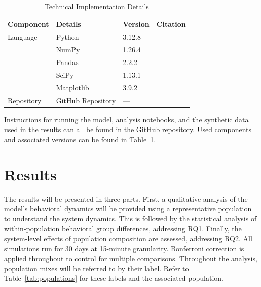 \documentclass[11pt, a4paper]{article}
\begin{document}
\begin{table}[h]
    \caption{Technical Implementation Details}
    \label{tab:technical_implementation}
    \centering
    \begin{tabular}{llll}
    \toprule
    Component & Details & Version & Citation \\
    \midrule
    Language & Python & 3.12.8 & \autocite{rossum_python_2007} \\
    \addlinespace
    \multirow{4}{*}{Packages} & NumPy & 1.26.4 & \autocite{harris_array_2020} \\
                              & Pandas & 2.2.2 & \autocite{mckinney_data_2010} \\
                              & SciPy & 1.13.1 & \autocite{virtanen_scipy_2020} \\
                              & Matplotlib & 3.9.2 & \autocite{hunter_matplotlib_2007} \\
    \addlinespace
    Repository & GitHub Repository & --- & \autocite{geschiere_electricity_thesis_andrey_geschiere_csai_2026} \\
    \bottomrule
    \end{tabular}
\end{table}
Instructions for running the model, analysis notebooks, and the synthetic data used in the results can all be found in the GitHub repository. Used components and associated versions can be found in Table~\ref{tab:technical_implementation}.

\section{Results}
The results will be presented in three parts. First, a qualitative analysis of the model's behavioral dynamics will be provided using a representative population to understand the system dynamics. This is followed by the statistical analysis of within-population behavioral group differences, addressing RQ1. Finally, the system-level effects of population composition are assessed, addressing RQ2. All simulations run for 30 days at 15-minute granularity. Bonferroni correction is applied throughout to control for multiple comparisons.
Throughout the analysis, population mixes will be referred to by their label. Refer to Table~\ref{tab:populations} for these labels and the associated population.
\end{document}
